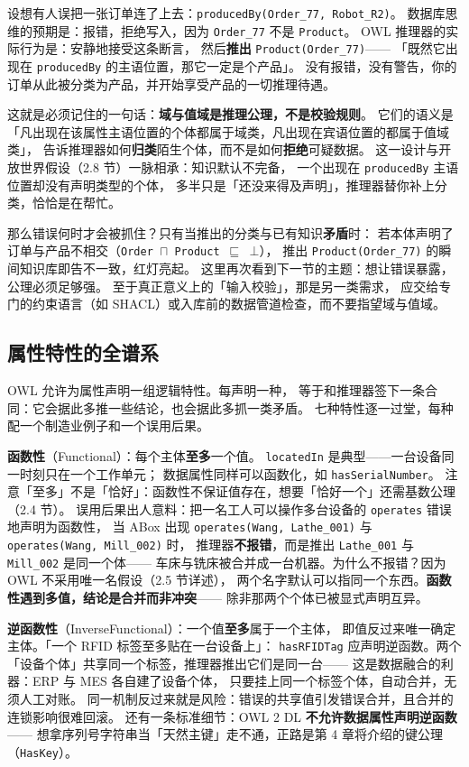 设想有人误把一张订单连了上去：\texttt{producedBy(Order\_77, Robot\_R2)}。
数据库思维的预期是：报错，拒绝写入，因为 \texttt{Order\_77} 不是 \texttt{Product}。
OWL 推理器的实际行为是：安静地接受这条断言，
然后\textbf{推出} \texttt{Product(Order\_77)}——
「既然它出现在 \texttt{producedBy} 的主语位置，那它一定是个产品」。
没有报错，没有警告，你的订单从此被分类为产品，并开始享受产品的一切推理待遇。

这就是必须记住的一句话：\textbf{域与值域是推理公理，不是校验规则}。
它们的语义是「凡出现在该属性主语位置的个体都属于域类，凡出现在宾语位置的都属于值域类」，
告诉推理器如何\textbf{归类}陌生个体，而不是如何\textbf{拒绝}可疑数据。
这一设计与开放世界假设（2.8 节）一脉相承：知识默认不完备，
一个出现在 \texttt{producedBy} 主语位置却没有声明类型的个体，
多半只是「还没来得及声明」，推理器替你补上分类，恰恰是在帮忙。

那么错误何时才会被抓住？只有当推出的分类与已有知识\textbf{矛盾}时：
若本体声明了订单与产品不相交（\texttt{Order \(\sqcap\) Product \(\sqsubseteq\) \(\bot\)}），
推出 \texttt{Product(Order\_77)} 的瞬间知识库即告不一致，红灯亮起。
这里再次看到下一节的主题：想让错误暴露，公理必须足够强。
至于真正意义上的「输入校验」，那是另一类需求，
应交给专门的约束语言（如 SHACL）或入库前的数据管道检查，而不要指望域与值域。

\subsection{属性特性的全谱系}

OWL 允许为属性声明一组逻辑特性。每声明一种，
等于和推理器签下一条合同：它会据此多推一些结论，也会据此多抓一类矛盾。
七种特性逐一过堂，每种配一个制造业例子和一个误用后果。

\textbf{函数性}（Functional）：每个主体\textbf{至多}一个值。
\texttt{locatedIn} 是典型——一台设备同一时刻只在一个工作单元；
数据属性同样可以函数化，如 \texttt{hasSerialNumber}。
注意「至多」不是「恰好」：函数性不保证值存在，想要「恰好一个」还需基数公理（2.4 节）。
误用后果出人意料：把一名工人可以操作多台设备的 \texttt{operates} 错误地声明为函数性，
当 ABox 出现 \texttt{operates(Wang, Lathe\_001)} 与 \texttt{operates(Wang, Mill\_002)} 时，
推理器\textbf{不报错}，而是推出 \texttt{Lathe\_001} 与 \texttt{Mill\_002} 是同一个体——
车床与铣床被合并成一台机器。为什么不报错？因为 OWL 不采用唯一名假设（2.5 节详述），
两个名字默认可以指同一个东西。\textbf{函数性遇到多值，结论是合并而非冲突}——
除非那两个个体已被显式声明互异。

\textbf{逆函数性}（InverseFunctional）：一个值\textbf{至多}属于一个主体，
即值反过来唯一确定主体。「一个 RFID 标签至多贴在一台设备上」：
\texttt{hasRFIDTag} 应声明逆函数。两个「设备个体」共享同一个标签，推理器推出它们是同一台——
这是数据融合的利器：ERP 与 MES 各自建了设备个体，
只要挂上同一个标签个体，自动合并，无须人工对账。
同一机制反过来就是风险：错误的共享值引发错误合并，且合并的连锁影响很难回滚。
还有一条标准细节：OWL 2 DL \textbf{不允许数据属性声明逆函数}——
想拿序列号字符串当「天然主键」走不通，正路是第 4 章将介绍的键公理（\texttt{HasKey}）。

